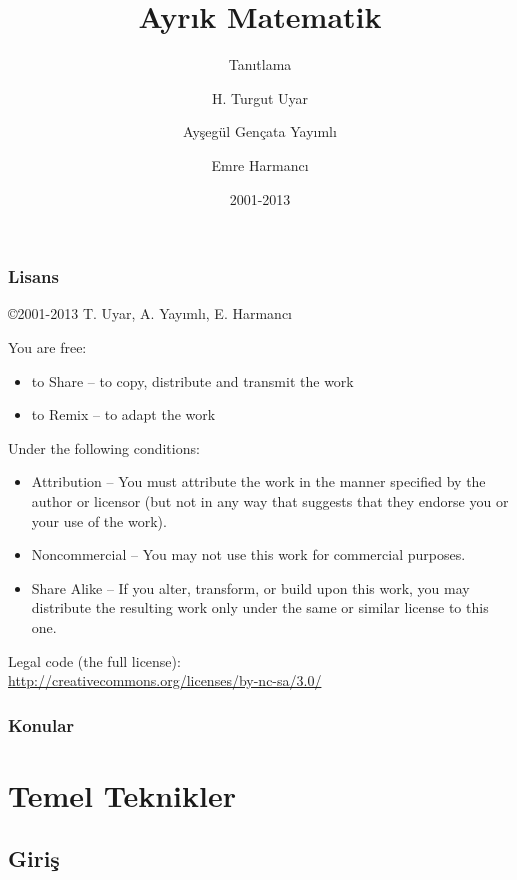 \documentclass[dvipsnames]{beamer}
\title{Ayrık Matematik}
\subtitle{Tanıtlama}
\author{H. Turgut Uyar \and Ayşegül Gençata Yayımlı \and Emre Harmancı}
\date{2001-2013}
\theoremstyle{definition}
\theoremstyle{example}
\theoremstyle{plain}
\begin{document}
\begin{frame}
  \titlepage
\end{frame}

\begin{frame}
  \frametitle{Lisans}

  \hfill
  \copyright 2001-2013 T. Uyar, A. Yayımlı, E. Harmancı

  \vfill
  \begin{tiny}
    You are free:
    \begin{itemize}
      \item to Share -- to copy, distribute and transmit the work
      \item to Remix -- to adapt the work
    \end{itemize}

    Under the following conditions:
    \begin{itemize}
      \item Attribution -- You must attribute the work in the manner specified by
        the author or licensor (but not in any way that suggests that they
        endorse you or your use of the work).

      \item Noncommercial -- You may not use this work for commercial purposes.

      \item Share Alike -- If you alter, transform, or build upon this work, you
        may distribute the resulting work only under the same or similar license
        to this one.
    \end{itemize}
  \end{tiny}

  \vfill
  Legal code (the full license):\\
  \url{http://creativecommons.org/licenses/by-nc-sa/3.0/}
\end{frame}

\begin{frame}
  \frametitle{Konular}
  \tableofcontents
\end{frame}

\section{Temel Teknikler}

\subsection{Giriş}
\end{document}
